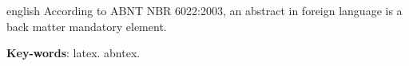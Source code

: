 \documentclass[
	article,			%
	11pt,				%
	oneside,			%
	a4paper,			%
	english,			%
	brazil,				%
	]{abntex2}
\begin{document}


\emptythanks
\maketitle

\renewcommand{\resumoname}{Abstract}
\begin{resumoumacoluna}
 \begin{otherlanguage*}{english}
   According to ABNT NBR 6022:2003, an abstract in foreign language is a back
   matter mandatory element.

   \vspace{\onelineskip}
 
   \noindent
   \textbf{Key-words}: latex. abntex.
 \end{otherlanguage*}  
\end{resumoumacoluna}
 
\end{document}
